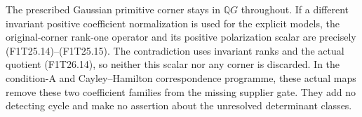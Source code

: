 The prescribed Gaussian primitive corner stays in
$\mathbb QG$ throughout. If a different invariant
positive coefficient normalization is used for the
explicit models, the original-corner rank-one operator
and its positive polarization scalar are precisely
(F1T25.14)--(F1T25.15). The contradiction uses invariant
ranks and the actual quotient (F1T26.14), so neither
this scalar nor any corner is discarded. In the
condition-A and Cayley--Hamilton correspondence
programme, these actual maps remove these two
coefficient families from the missing supplier gate.
They add no detecting cycle and make no assertion
about the unresolved determinant classes.

